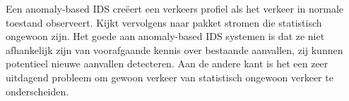 Een anomaly-based IDS creëert een verkeers profiel als het verkeer in normale toestand observeert. Kijkt vervolgens naar pakket stromen die statistisch ongewoon zijn. Het goede aan anomaly-based IDS systemen is dat ze niet afhankelijk zijn van voorafgaande kennis over bestaande aanvallen, zij kunnen potentieel nieuwe aanvallen detecteren. Aan de andere kant is het een zeer uitdagend probleem om gewoon verkeer van statistisch ongewoon verkeer te onderscheiden.
